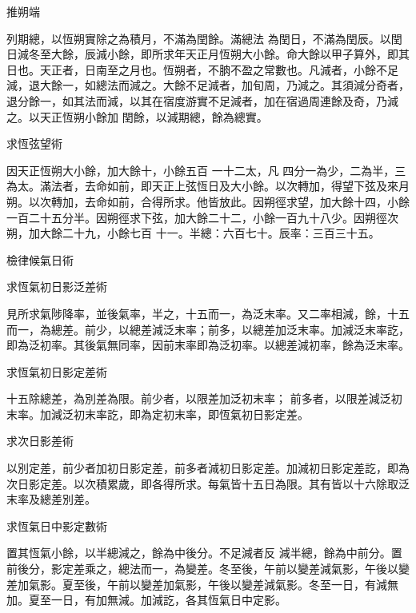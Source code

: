 \begin{pinyinscope}
 推朔端



 列期總，以恆朔實除之為積月，不滿為閏餘。滿總法
 為閏日，不滿為閏辰。以閏日減冬至大餘，辰減小餘，即所求年天正月恆朔大小餘。命大餘以甲子算外，即其日也。天正者，日南至之月也。恆朔者，不朒不盈之常數也。凡減者，小餘不足減，退大餘一，如總法而減之。大餘不足減者，加旬周，乃減之。其須減分奇者，退分餘一，如其法而減，以其在宿度游實不足減者，加在宿過周連餘及奇，乃減之。以天正恆朔小餘加
 閏餘，以減期總，餘為總實。



 求恆弦望術



 因天正恆朔大小餘，加大餘十，小餘五百
 一十二太，凡
 四分一為少，二為半，三為太。滿法者，去命如前，即天正上弦恆日及大小餘。以次轉加，得望下弦及來月朔。以次轉加，去命如前，合得所求。他皆放此。因朔徑求望，加大餘十四，小餘一百二十五分半。因朔徑求下弦，加大餘二十二，小餘一百九十八少。因朔徑次朔，加大餘二十九，小餘七百
 十一。半總：六百七十。辰率：三百三十五。



 檢律候氣日術



 求恆氣初日影泛差術



 見所求氣陟降率，並後氣率，半之，十五而一，為泛末率。又二率相減，餘，十五而一，為總差。前少，以總差減泛末率；前多，以總差加泛末率。加減泛末率訖，即為泛初率。其後氣無同率，因前末率即為泛初率。以總差減初率，餘為泛末率。



 求恆氣初日影定差術



 十五除總差，為別差為限。前少者，以限差加泛初末率；
 前多者，以限差減泛初末率。加減泛初末率訖，即為定初末率，即恆氣初日影定差。



 求次日影差術



 以別定差，前少者加初日影定差，前多者減初日影定差。加減初日影定差訖，即為次日影定差。以次積累歲，即各得所求。每氣皆十五日為限。其有皆以十六除取泛末率及總差別差。



 求恆氣日中影定數術



 置其恆氣小餘，以半總減之，餘為中後分。不足減者反
 減半總，餘為中前分。置前後分，影定差乘之，總法而一，為變差。冬至後，午前以變差減氣影，午後以變差加氣影。夏至後，午前以變差加氣影，午後以變差減氣影。冬至一日，有減無加。夏至一日，有加無減。加減訖，各其恆氣日中定影。




\end{pinyinscope}
